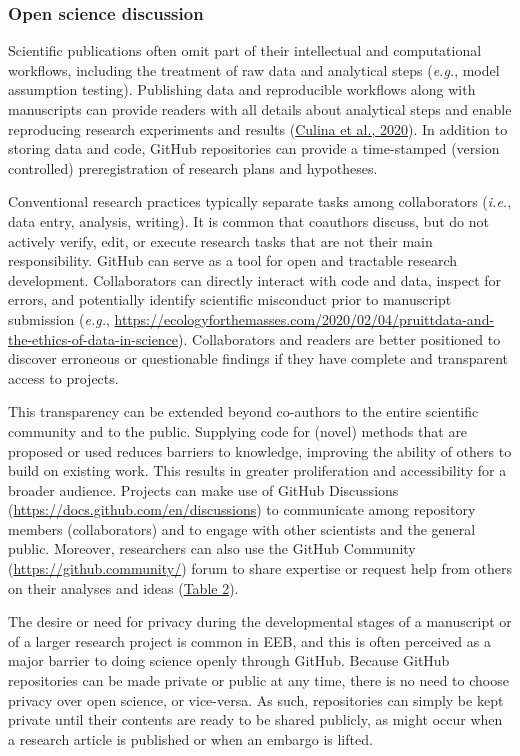 \hypertarget{open-science-discussion}{%
\subsubsection{Open science discussion}\label{open-science-discussion}}

Scientific publications often omit part of their intellectual and computational workflows, including the treatment of raw data and analytical steps (\emph{e.g.}, model assumption testing).
Publishing data and reproducible workflows along with manuscripts can provide readers with all details about analytical steps and enable reproducing research experiments and results (\protect\hyperlink{ref-NOgBWVAr}{Culina et al., 2020}).
In addition to storing data and code, GitHub repositories can provide a time-stamped (version controlled) preregistration of research plans and hypotheses.

Conventional research practices typically separate tasks among collaborators (\emph{i.e.}, data entry, analysis, writing).
It is common that coauthors discuss, but do not actively verify, edit, or execute research tasks that are not their main responsibility.
GitHub can serve as a tool for open and tractable research development.
Collaborators can directly interact with code and data, inspect for errors, and potentially identify scientific misconduct prior to manuscript submission (\emph{e.g.}, \url{https://ecologyforthemasses.com/2020/02/04/pruittdata-and-the-ethics-of-data-in-science}).
Collaborators and readers are better positioned to discover erroneous or questionable findings if they have complete and transparent access to projects.

This transparency can be extended beyond co-authors to the entire scientific community and to the public.
Supplying code for (novel) methods that are proposed or used reduces barriers to knowledge, improving the ability of others to build on existing work.
This results in greater proliferation and accessibility for a broader audience.
Projects can make use of GitHub Discussions (\url{https://docs.github.com/en/discussions}) to communicate among repository members (collaborators) and to engage with other scientists and the general public.
Moreover, researchers can also use the GitHub Community (\url{https://github.community/}) forum to share expertise or request help from others on their analyses and ideas (\protect\hyperlink{tbl:roles}{Table 2}).

The desire or need for privacy during the developmental stages of a manuscript or of a larger research project is common in EEB, and this is often perceived as a major barrier to doing science openly through GitHub.
Because GitHub repositories can be made private or public at any time, there is no need to choose privacy over open science, or vice-versa.
As such, repositories can simply be kept private until their contents are ready to be shared publicly, as might occur when a research article is published or when an embargo is lifted.

